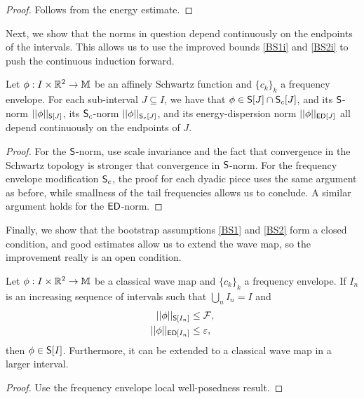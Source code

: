 \begin{proof}
	Follows from the energy estimate. 
\end{proof}

Next, we show that the norms in question depend continuously on the endpoints of the intervals. This allows us to use the improved bounds \eqref{BS1i} and \eqref{BS2i} to push the continuous induction forward. 

\begin{lemma}
	Let $\phi : I \times \mathbb R^2 \to \mathbb M$ be an affinely Schwartz function and $\{c_k\}_k$ a frequency envelope. For each sub-interval $J \subseteq I$, we have that $\phi \in \mathsf S[J] \cap \mathsf S_c [J]$, and its $\mathsf S$-norm $||\phi||_{\mathsf S[J]}$, its $\mathsf S_c$-norm $||\phi||_{\mathsf S_c[J]}$, and its energy-dispersion norm $||\phi||_{\mathsf{ED}[J]}$ all depend continuously on the endpoints of $J$. 
\end{lemma}

\begin{proof}
	For the $\mathsf S$-norm, use scale invariance and the fact that convergence in the Schwartz topology is stronger that convergence in $\mathsf S$-norm. For the frequency envelope modification $\mathsf S_c$, the proof for each dyadic piece uses the same argument as before, while smallness of the tail frequencies allows us to conclude. A similar argument holds for the $\mathsf{ED}$-norm. 
\end{proof}

Finally, we show that the bootstrap assumptions \eqref{BS1} and \eqref{BS2} form a closed condition, and good estimates allow us to extend the wave map, so the improvement really is an open condition. 

\begin{lemma}
	Let $\phi : I \times \mathbb R^2 \to \mathbb M$ be a classical wave map and $\{c_k\}_k$ a frequency envelope. If $I_n$ is an increasing sequence of intervals such that $\bigcup_n I_n = I$ and 
			\begin{align*}
				||\phi||_{\mathsf S[I_n]} 
					&\leq \mathcal F, \\
				||\phi||_{\mathsf{ED} [I_n]} 
					&\leq \varepsilon,
			\end{align*}		
		then $\phi \in \mathsf S[I]$. Furthermore, it can be extended to a classical wave map in a larger interval. 
\end{lemma}

\begin{proof}
	Use the frequency envelope local well-posedness result. 
\end{proof}



